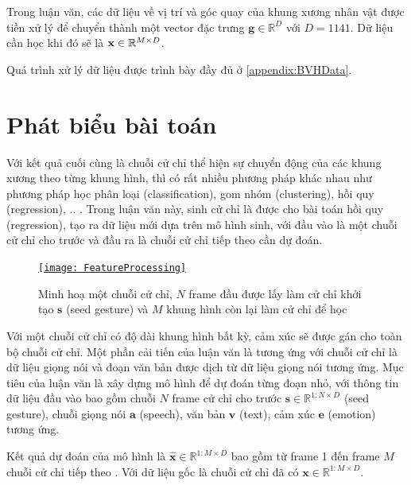 Trong luận văn, các dữ liệu về vị trí và góc quay của khung xương nhân vật được tiền xử lý để chuyển thành một vector đặc trưng $\mathbf{g} \in \mathbb{R}^{D}$ với $D=1141$. Dữ liệu cần học khi đó sẽ là $\mathbf{x} \in \mathbb{R}^{M \times D}$.

Quá trình xử lý dữ liệu được trình bày đầy đủ ở \autoref{appendix:BVHData}.

\section{Phát biểu bài toán}
\label{sec:ProblemStatement}

Với kết quả cuối cùng là chuỗi cử chỉ thể hiện sự chuyển động của các khung xương theo từng khung hình, thì có rất nhiều phương pháp khác nhau như phương pháp học phân loại (classification), gom nhóm (clustering), hồi quy (regression), .. . Trong luận văn này, sinh cử chỉ là  được cho bài toán hồi quy (regression), tạo ra dữ liệu mới dựa trên mô hình sinh, với đầu vào là một chuỗi cử chỉ cho trước và đầu ra là chuỗi cử chỉ tiếp theo cần dự đoán.
	
\begin{figure}[H]
	\centering
	\href{https://www.youtube.com/watch?v=B6nv1kQmi-Q}{\texttt{[image: FeatureProcessing]}}
	\caption{Minh hoạ một chuỗi cử chỉ, $N$ frame đầu được lấy làm cử chỉ khởi tạo $\mathbf{s}$ (seed gesture) và $M$ khung hình còn lại làm cử chỉ để học}
	\label{fig:GestureSeries}
\end{figure}

Với một chuỗi cử chỉ có độ dài khung hình bất kỳ, cảm xúc sẽ được gán cho toàn bộ chuỗi cử chỉ. Một phần cải tiến của luận văn là tương ứng với chuỗi cử chỉ là dữ liệu giọng nói và đoạn văn bản được dịch từ dữ liệu giọng nói tương ứng.
Mục tiêu của luận văn là xây dựng mô hình để dự đoán từng đoạn nhỏ, với thông tin dữ liệu đầu vào bao gồm chuỗi $N$ frame cử chỉ cho trước $\mathbf{s} \in \mathbb{R}^{1:N \times D}$ (seed gesture), chuỗi giọng nói $\mathbf{a}$ (speech), văn bản $\mathbf{v}$ (text),  cảm xúc $\mathbf{e}$ (emotion) tương ứng.

Kết quả dự đoán của mô hình là $\hat{\mathbf{x}} \in \mathbb{R}^{1:M \times D}$ bao gồm từ frame 1 đến frame $M$ chuỗi cử chỉ tiếp theo . Với dữ liệu gốc là chuỗi cử chỉ đã có $\mathbf{x}  \in \mathbb{R}^{1:M \times D}$.

